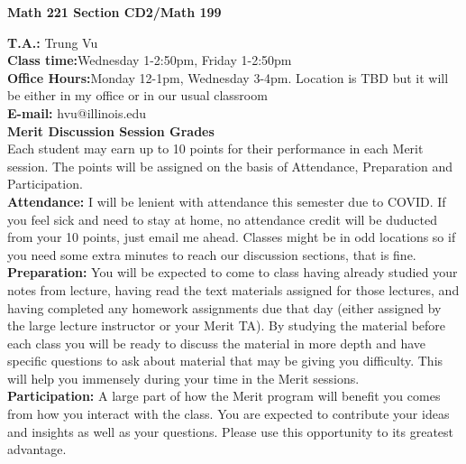 \documentclass[12pt]{article}
\begin{document}
\begin{center}
\textbf{Math 221 Section CD2/Math 199}
\end{center}

\noindent \textbf{T.A.:} Trung Vu\\	
\textbf{Class time:}Wednesday 1-2:50pm, Friday 1-2:50pm\\
\textbf{Office Hours:}Monday 12-1pm, Wednesday 3-4pm. Location is TBD but it will be either in my office or in our usual classroom\\
\textbf{E-mail:} hvu@illinois.edu\\

\noindent \textbf{Merit Discussion Session Grades}\\
Each student may earn up to 10 points for their performance in each Merit session. The points will be assigned on the basis of Attendance, Preparation and Participation.\\
\textbf{Attendance:} I will be lenient with attendance this semester due to COVID. If you feel sick and need to stay at home, no attendance credit will be duducted from  your 10 points, just email me ahead. Classes might be in odd locations so if you need some extra minutes to reach our discussion sections, that is fine.\\
\textbf{Preparation:} You will be expected to come to class having already studied your notes from lecture, having read the text materials assigned for those lectures, and having completed any homework assignments due that day (either assigned by the large lecture instructor or your Merit TA). By studying the material before each class you will be ready to discuss the material in more depth and have specific questions to ask about material that may be giving you difficulty. This will help you immensely during your time in the Merit sessions.\\
\textbf{Participation:}  A large part of how the Merit program will benefit you comes from how you interact with the class.  You are expected to contribute your ideas and insights as well as your questions.  Please use this opportunity to its greatest advantage.\\
\end{document}
